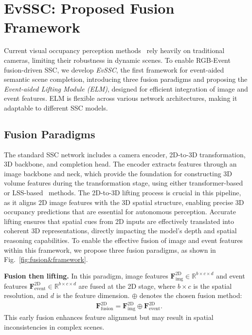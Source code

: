 
%
\section{EvSSC: Proposed Fusion Framework}
%

%
Current visual occupancy perception methods~\cite{li2023voxformer,mei2024sgn,cao2022monoscene} rely heavily on traditional cameras, limiting their robustness in dynamic scenes. 
To enable RGB-Event fusion-driven SSC, we develop \emph{EvSSC}, the first framework for event-aided semantic scene completion, introducing three fusion paradigms and proposing the \emph{Event-aided Lifting Module (ELM)}, designed for efficient integration of image and event features. ELM is flexible across various network architectures, making it adaptable to different SSC models.

%

%
\subsection{Fusion Paradigms}
%

%
The standard SSC network includes a camera encoder, 2D-to-3D transformation, 3D backbone, and completion head. The encoder extracts features through an image backbone and neck, which provide the foundation for constructing 3D volume features during the transformation stage, using either transformer-based~\cite{li2023voxformer,huang2023tpvformer} or LSS-based~\cite{mei2024sgn,philion2020lift,zhang2023occformer} methods. The 2D-to-3D lifting process is crucial in this pipeline, as it aligns 2D image features with the 3D spatial structure, enabling precise 3D occupancy predictions that are essential for autonomous perception. Accurate lifting ensures that spatial cues from 2D inputs are effectively translated into coherent 3D representations, directly impacting the model’s depth and spatial reasoning capabilities. To enable the effective fusion of image and event features within this framework, we propose three fusion paradigms, as shown in Fig.~\ref{fig:fusion&framework}.

%
\noindent\textbf{Fusion then lifting.} 
%
In this paradigm, image features \( \mathbf{F}^{\text{2D}}_{\text{img}} {\in} \mathbb{R}^{b \times c \times d} \) and event features \( \mathbf{F}^{\text{2D}}_{\text{event}} {\in} \mathbb{R}^{b \times c \times d} \) are fused at the 2D stage, where \( b {\times} c \) is the spatial resolution, and \( d \) is the feature dimension. $\oplus$ denotes the chosen fusion method:
\begin{align}
&\mathbf{F}^{\text{2D}}_{\text{fusion}} = \mathbf{F}^{\text{2D}}_{\text{img}} \oplus \mathbf{F}^{\text{2D}}_{\text{event}}.
\end{align}
This early fusion enhances feature alignment but may result in spatial inconsistencies in complex scenes.

